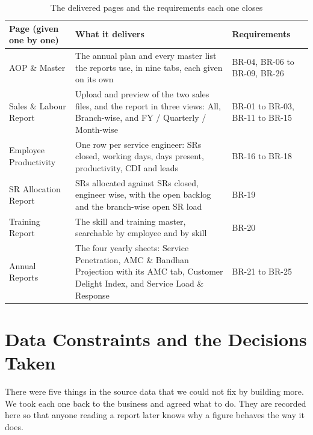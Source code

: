 \documentclass[11pt,a4paper]{article}
\begin{document}
\begin{table}[H]\centering\small
\renewcommand{\arraystretch}{1.2}
\begin{tabularx}{\linewidth}{@{}|p{3.9cm}|X|p{2.6cm}|@{}}
\hline
\rowcolor{brdhead}\textbf{Page (given one by one)} & \textbf{What it delivers} &
\textbf{Requirements}\\
\hline
AOP \& Master & The annual plan and every master list the reports use, in nine tabs, each
given on its own & BR-04, BR-06 to BR-09, BR-26\\
\hline
Sales \& Labour Report & Upload and preview of the two sales files, and the report in
three views: All, Branch-wise, and FY / Quarterly / Month-wise & BR-01 to BR-03,
BR-11 to BR-15\\
\hline
Employee Productivity & One row per service engineer: SRs closed, working days, days
present, productivity, CDI and leads & BR-16 to BR-18\\
\hline
SR Allocation Report & SRs allocated against SRs closed, engineer wise, with the open
backlog and the branch-wise open SR load & BR-19\\
\hline
Training Report & The skill and training master, searchable by employee and by skill &
BR-20\\
\hline
Annual Reports & The four yearly sheets: Service Penetration, AMC \& Bandhan Projection
with its AMC tab, Customer Delight Index, and Service Load \& Response & BR-21 to BR-25\\
\hline
\end{tabularx}
\caption{The delivered pages and the requirements each one closes}
\end{table}

\section{Data Constraints and the Decisions Taken}
\label{sec:constraints}

There were five things in the source data that we could not fix by building more. We took
each one back to the business and agreed what to do. They are recorded here so that anyone
reading a report later knows why a figure behaves the way it does.
\end{document}
